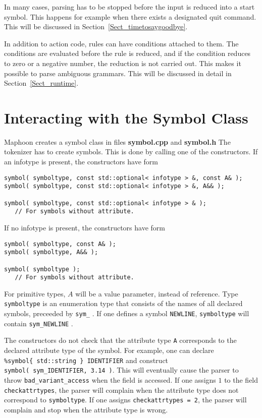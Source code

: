 \documentclass{article}
\begin{document}
In many cases, parsing has to be stopped before the input is reduced 
into a start symbol. This happens for example when there
exists a designated quit command. This will be discussed
in Section~\ref{Sect_timetosaygoodbye}.

In addition to action code, rules can have conditions attached to them.
The conditions are evaluated before the rule is reduced, and 
if the condition reduces to zero or a negative number, the reduction is
not carried out. This makes it possible to parse ambiguous grammars. 
This will be discussed in detail in Section~\ref{Sect_runtime}.

\section{Interacting with the Symbol Class}

Maphoon creates a symbol class in files
{\bf symbol.cpp} and {\bf symbol.h}
The tokenizer has to create symbols. 
This is done by calling one of the constructors.
If an infotype is present, the constructors have form
\begin{verbatim}
symbol( symboltype, const std::optional< infotype > &, const A& );
symbol( symboltype, const std::optional< infotype > &, A&& ); 

symbol( symboltype, const std::optional< infotype > & );
   // For symbols without attribute. \end{verbatim}
If no infotype is present, the constructors have form
\begin{verbatim}
symbol( symboltype, const A& );
symbol( symboltype, A&& ); 

symbol( symboltype );
   // For symbols without attribute. \end{verbatim}
For primitive types, $ A $ will be a value parameter,
instead of reference. 
Type \verb+symboltype+ is an enumeration type that
consists of the names of all declared symbols, preceeded
by \verb+sym_+ . If one defines a symbol \verb+NEWLINE+,  
\verb+symboltype+ will contain \verb+sym_NEWLINE+  .

The constructors do not check that the attribute type 
\verb+A+ corresponds to the declared attribute type of
the symbol. 
For example, one can declare \\
\verb+%symbol{ std::string } IDENTIFIER+ 
and construct \\ \verb+symbol( sym_IDENTIFIER, 3.14 )+.
This will eventually cause the parser to throw 
\verb+bad_variant_access+ when the field is accessed.
If one assigns $ 1 $ to the field \verb+checkattrtypes+, the parser
will complain 
when the attribute type does not correspond
to \verb+symboltype+. If one assigns
\verb+checkattrtypes = 2+, the parser will complain and stop when
the attribute type is wrong.
\end{document}
